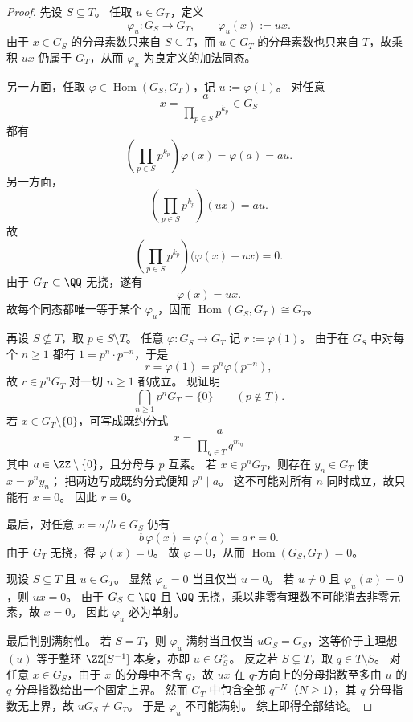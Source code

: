 \begin{proof}
先设 \(S\subseteq T\)。
任取 \(u\in G_T\)，定义
\[
\varphi_u:G_S\to G_T,
\qquad
\varphi_u(x):=ux.
\]
由于 \(x\in G_S\) 的分母素数只来自 \(S\subseteq T\)，而 \(u\in G_T\) 的分母素数也只来自
\(T\)，故乘积 \(ux\) 仍属于 \(G_T\)，从而 \(\varphi_u\) 为良定义的加法同态。
\par
另一方面，任取 \(\varphi\in\operatorname{Hom}(G_S,G_T)\)，记 \(u:=\varphi(1)\)。
对任意
\[
x=\frac{a}{\prod_{p\in S}p^{k_p}}\in G_S
\]
都有
\[
\left(\prod_{p\in S}p^{k_p}\right)\varphi(x)=\varphi(a)=au.
\]
另一方面，
\[
\left(\prod_{p\in S}p^{k_p}\right)(ux)=au.
\]
故
\[
\left(\prod_{p\in S}p^{k_p}\right)\bigl(\varphi(x)-ux\bigr)=0.
\]
由于 \(G_T\subset\QQ\) 无挠，遂有
\[
\varphi(x)=ux.
\]
故每个同态都唯一等于某个 \(\varphi_u\)，因而
\(
\operatorname{Hom}(G_S,G_T)\cong G_T
\)。
\par
再设 \(S\not\subseteq T\)，取 \(p\in S\setminus T\)。
任意 \(\varphi:G_S\to G_T\) 记 \(r:=\varphi(1)\)。
由于在 \(G_S\) 中对每个 \(n\ge 1\) 都有 \(1=p^n\cdot p^{-n}\)，于是
\[
r=\varphi(1)=p^n\varphi(p^{-n}),
\]
故 \(r\in p^nG_T\) 对一切 \(n\ge 1\) 都成立。
现证明
\[
\bigcap_{n\ge 1}p^nG_T=\{0\}
\qquad (p\notin T).
\]
若 \(x\in G_T\setminus\{0\}\)，可写成既约分式
\[
x=\frac{a}{\prod_{q\in T}q^{m_q}}
\]
其中 \(a\in\ZZ\setminus\{0\}\)，且分母与 \(p\) 互素。
若 \(x\in p^nG_T\)，则存在 \(y_n\in G_T\) 使 \(x=p^n y_n\)；
把两边写成既约分式便知 \(p^n\mid a\)。
这不可能对所有 \(n\) 同时成立，故只能有 \(x=0\)。
因此 \(r=0\)。
\par
最后，对任意 \(x=a/b\in G_S\) 仍有
\[
b\,\varphi(x)=\varphi(a)=a\,r=0.
\]
由于 \(G_T\) 无挠，得 \(\varphi(x)=0\)。
故 \(\varphi=0\)，从而
\(
\operatorname{Hom}(G_S,G_T)=0
\)。
\par
现设 \(S\subseteq T\) 且 \(u\in G_T\)。
显然 \(\varphi_u=0\) 当且仅当 \(u=0\)。
若 \(u\neq 0\) 且 \(\varphi_u(x)=0\)，则 \(ux=0\)。
由于 \(G_S\subset\QQ\) 且 \(\QQ\) 无挠，乘以非零有理数不可能消去非零元素，故 \(x=0\)。
因此 \(\varphi_u\) 必为单射。
\par
最后判别满射性。
若 \(S=T\)，则 \(\varphi_u\) 满射当且仅当 \(uG_S=G_S\)，这等价于主理想 \((u)\) 等于整环
\(\ZZ[S^{-1}]\) 本身，亦即 \(u\in G_S^\times\)。
反之若 \(S\subsetneq T\)，取 \(q\in T\setminus S\)。
对任意 \(x\in G_S\)，由于 \(x\) 的分母中不含 \(q\)，故 \(ux\) 在 \(q\)-方向上的分母指数至多由
\(u\) 的 \(q\)-分母指数给出一个固定上界。
然而 \(G_T\) 中包含全部 \(q^{-N}\)（\(N\ge 1\)），其 \(q\)-分母指数无上界，故
\(uG_S\neq G_T\)。
于是 \(\varphi_u\) 不可能满射。
综上即得全部结论。
\end{proof}

